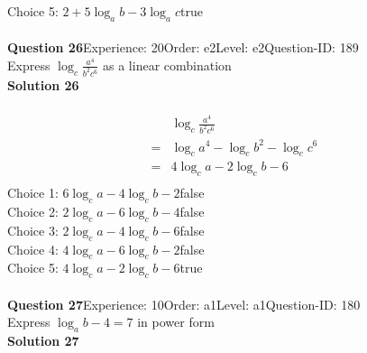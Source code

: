 \documentclass{article}
\begin{document}
Choice 5: \hspace{20pt}$2+5\log_{a}b-3\log_{a}c$\hspace{20pt}true\\
\\[4pt]
\noindent\textbf{Question 26}\hspace{20pt}Experience: 20\hspace{20pt}Order: e2\hspace{20pt}Level: e2\hspace{20pt}Question-ID: 189\\[2pt]
Express $\log_{c}\displaystyle\frac{a^4}{b^2c^6}$ as a linear combination\\[4pt]
\noindent\textbf{Solution 26}\\[2pt]
\\[-35pt]\begin{align*}
&\log_{c}\displaystyle\frac{a^4}{b^2c^6}\\[2pt]
=&\log_{c}a^4-\log_{c}b^2-\log_{c}c^6\\[2pt]
=&4\log_{c}a-2\log_{c}b-6\\[-30pt]
\end{align*}
Choice 1: \hspace{20pt}$6\log_{c}a-4\log_{c}b-2$\hspace{20pt}false\\
Choice 2: \hspace{20pt}$2\log_{c}a-6\log_{c}b-4$\hspace{20pt}false\\
Choice 3: \hspace{20pt}$2\log_{c}a-4\log_{c}b-6$\hspace{20pt}false\\
Choice 4: \hspace{20pt}$4\log_{c}a-6\log_{c}b-2$\hspace{20pt}false\\
Choice 5: \hspace{20pt}$4\log_{c}a-2\log_{c}b-6$\hspace{20pt}true\\
\\[4pt]
\noindent\textbf{Question 27}\hspace{20pt}Experience: 10\hspace{20pt}Order: a1\hspace{20pt}Level: a1\hspace{20pt}Question-ID: 180\\[2pt]
Express $\log_{a}b-4=7$ in power form\\[4pt]
\noindent\textbf{Solution 27}\\[2pt]
\end{document}
